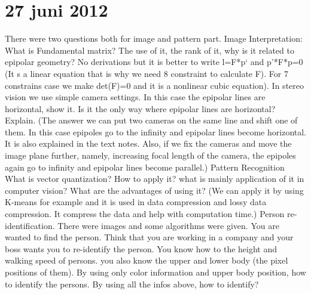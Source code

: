 \documentclass{article}
\begin{document}
\section*{27 juni 2012}
\begin{quest}
There were two questions both for image and pattern part.
Image Interpretation:
What is Fundamental matrix? The use of it, the rank of it, why is it related to epipolar geometry? No derivations but it is better to write l=F*p` and p'*F*p=0
(It s a linear equation that is why we need 8 constraint to calculate F). For 7 constrains case we make det(F)=0 and it is a nonlinear cubic equation).
In stereo vision we use simple camera settings. In this case the epipolar lines are horizontal, show it. Is it the only way where epipolar lines are horizontal? Explain.
(The answer we can put two cameras on the same line and shift one of them. In this case epipoles go to the infinity and epipolar lines become horizontal. It is also explained in the text notes. Also, if we fix the cameras and move the image plane further, namely, increasing focal length of the camera, the epipoles again go to infinity and epipolar lines become parallel.)
Pattern Recognition
What is vector quantization? How to apply it? what is mainly application of it in computer vision? What are the advantages of using it?
(We can apply it by using K-means for example and it is used in data compression and lossy data compression. It compress the data and help with computation time.)
Person re-identification.
There were images and some algorithms were given. You are wanted to find the person. Think that you are working in a company and your boss wants you to re-identify the person. You know how to the height and walking speed of persons. you also know the upper and lower body (the pixel positions of them).
By using only color information and upper body position, how to identify the persons.
By using all the infos above, how to identify?
\end{quest}
\end{document}
